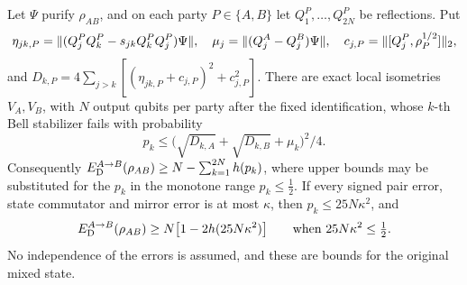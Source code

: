 \begin{theorem}\label{thm:signed-regular}
Let $\Psi$ purify $\rho_{AB}$, and on each party $P\in\{A,B\}$ let $Q^P_1,\dots,Q^P_{2N}$ be reflections. Put
\[
\eta_{jk,P}=\|(Q^P_jQ^P_k-s_{jk}Q^P_kQ^P_j)\Psi\|,\quad\mu_j=\|(Q^A_j-Q^B_j)\Psi\|,\quad c_{j,P}=\lVert [Q^P_j,\rho_P^{1/2}]\rVert_2,
\]
and $D_{k,P}=4\sum_{j>k}[(\eta_{jk,P}+c_{j,P})^2+c_{j,P}^2]$. There are exact local isometries $V_A,V_B$, with
$N$ output qubits per party after the fixed identification, whose $k$-th Bell stabilizer fails with probability
\[
p_k\le\bigl(\sqrt{D_{k,A}}+\sqrt{D_{k,B}}+\mu_k\bigr)^2/4 .
\]
Consequently $E_{\mathrm D}^{A\to B}(\rho_{AB})\ge N-\sum_{k=1}^{2N}h(p_k)$, where upper bounds may be substituted for the $p_k$ in
the monotone range $p_k\le\frac12$. If every signed pair error, state commutator and mirror error is at most $\kappa$,
then $p_k\le25N\kappa^2$, and
\[
E_{\mathrm D}^{A\to B}(\rho_{AB})\ge N\bigl[1-2h(25N\kappa^2)\bigr]\qquad\text{when }25N\kappa^2\le\tfrac12 .
\]
No independence of the errors is assumed, and these are bounds for the original mixed state.
\end{theorem}

